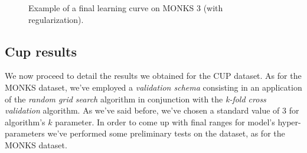 \documentclass[11pt,twoside]{article}
\begin{document}
    \begin{figure}[htbp]
        \centering
        \begin{subfigure}{0.90\textwidth}
            \caption{}
            \label{fig:monks_3_MSE_reg}
        \end{subfigure}
        \begin{subfigure}{0.90\textwidth}
            \caption{}
            \label{fig:monks_3_ACC_reg}
        \end{subfigure}
        \caption{Example of a final learning curve on MONKS 3 (with regularization).}
        \label{fig:monks_3_final_results}
    \end{figure}


    \subsection{Cup results} %
    \label{sub:cup_results}
        We now proceed to detail the results we obtained for the CUP dataset. As for the MONKS dataset, we've
        employed a \textit{validation schema} consisting in an application of the \textit{random grid search}
        algorithm in conjunction with the \textit{k-fold cross validation} algorithm. As we've said before,
        we've chosen a standard value of $3$ for algorithm's $k$ parameter. In order to come up with final
        ranges for model's hyper-parameters we've performed some preliminary tests on the dataset, as for the
        MONKS dataset.
\end{document}

